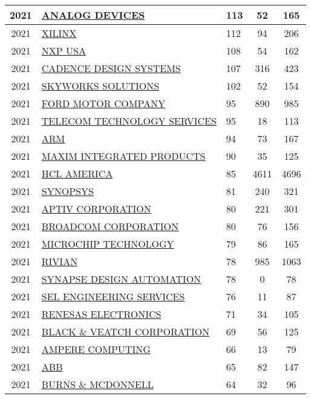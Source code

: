 \documentclass{article}%
\begin{document}
\begin{longtable}{c|p{20em}|p{5em}|c|c}
\hline%
2021&\hyperref[subsec:ANALOGDEVICES]{ANALOG DEVICES}&113&52&165\\%
\hline%
2021&\hyperref[subsec:XILINX]{XILINX}&112&94&206\\%
\hline%
2021&\hyperref[subsec:NXPUSA]{NXP USA}&108&54&162\\%
\hline%
2021&\hyperref[subsec:CADENCEDESIGNSYSTEMS]{CADENCE DESIGN SYSTEMS}&107&316&423\\%
\hline%
2021&\hyperref[subsec:SKYWORKSSOLUTIONS]{SKYWORKS SOLUTIONS}&102&52&154\\%
\hline%
2021&\hyperref[subsec:FORDMOTORCOMPANY]{FORD MOTOR COMPANY}&95&890&985\\%
\hline%
2021&\hyperref[subsec:TELECOMTECHNOLOGYSERVICES]{TELECOM TECHNOLOGY SERVICES}&95&18&113\\%
\hline%
2021&\hyperref[subsec:ARM]{ARM}&94&73&167\\%
\hline%
2021&\hyperref[subsec:MAXIMINTEGRATEDPRODUCTS]{MAXIM INTEGRATED PRODUCTS}&90&35&125\\%
\hline%
2021&\hyperref[subsec:HCLAMERICA]{HCL AMERICA}&85&4611&4696\\%
\hline%
2021&\hyperref[subsec:SYNOPSYS]{SYNOPSYS}&81&240&321\\%
\hline%
2021&\hyperref[subsec:APTIVCORPORATION]{APTIV CORPORATION}&80&221&301\\%
\hline%
2021&\hyperref[subsec:BROADCOMCORPORATION]{BROADCOM CORPORATION}&80&76&156\\%
\hline%
2021&\hyperref[subsec:MICROCHIPTECHNOLOGY]{MICROCHIP TECHNOLOGY}&79&86&165\\%
\hline%
2021&\hyperref[subsec:RIVIAN]{RIVIAN}&78&985&1063\\%
\hline%
2021&\hyperref[subsec:SYNAPSEDESIGNAUTOMATION]{SYNAPSE DESIGN AUTOMATION}&78&0&78\\%
\hline%
2021&\hyperref[subsec:SELENGINEERINGSERVICES]{SEL ENGINEERING SERVICES}&76&11&87\\%
\hline%
2021&\hyperref[subsec:RENESASELECTRONICS]{RENESAS ELECTRONICS}&71&34&105\\%
\hline%
2021&\hyperref[subsec:BLACKVEATCHCORPORATION]{BLACK \& VEATCH CORPORATION}&69&56&125\\%
\hline%
2021&\hyperref[subsec:AMPERECOMPUTING]{AMPERE COMPUTING}&66&13&79\\%
\hline%
2021&\hyperref[subsec:ABB]{ABB}&65&82&147\\%
\hline%
2021&\hyperref[subsec:BURNSMCDONNELL]{BURNS \& MCDONNELL}&64&32&96\\%

\end{longtable}
\end{document}
